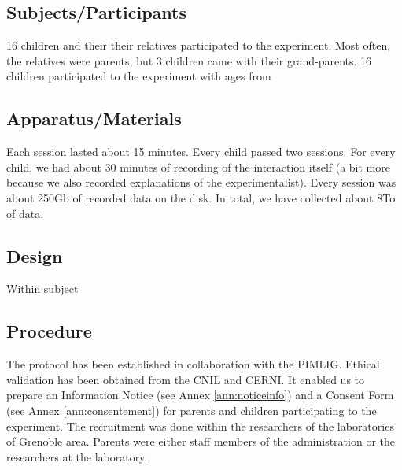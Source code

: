 \documentclass[smallextended]{svjour3}
\begin{document}
\subsection{Subjects/Participants}
16 children and their their relatives participated to the experiment. 
Most often, the relatives were parents, but 3 children came with their grand-parents.
16 children participated to the experiment with ages from  


\subsection{Apparatus/Materials}

Each session lasted about 15 minutes. 
Every child passed two sessions. 
For every child, we had about 30 minutes of recording of the interaction itself (a bit more because we also recorded explanations of the experimentalist). 
Every session was about 250Gb of recorded data on the disk. 
In total, we have collected about 8To of data. 


\subsection{Design}
Within subject

\subsection{Procedure}
The protocol has been established in collaboration with the PIMLIG.
Ethical  validation has been obtained from the CNIL and CERNI.
It enabled us to prepare an Information Notice (see Annex \ref{ann:noticeinfo}) and a Consent Form  (see Annex \ref{ann:consentement}) for parents and children participating to the experiment.
The recruitment was done within the researchers of the laboratories of Grenoble area. 
Parents were either staff members of the administration or the researchers at the laboratory.
\end{document}
